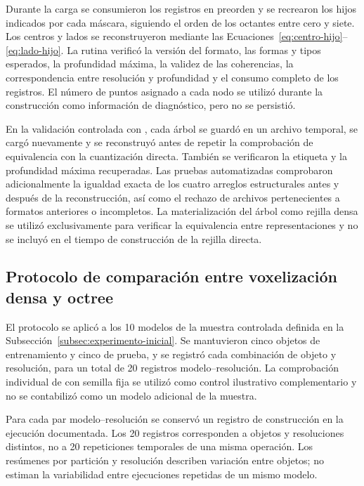 Durante la carga se consumieron los registros en preorden y se recrearon los hijos indicados por cada máscara, siguiendo el orden de los octantes entre cero y siete. Los centros y lados se reconstruyeron mediante las Ecuaciones~\eqref{eq:centro-hijo}--\eqref{eq:lado-hijo}. La rutina verificó la versión del formato, las formas y tipos esperados, la profundidad máxima, la validez de las coherencias, la correspondencia entre resolución y profundidad y el consumo completo de los registros. El número de puntos asignado a cada nodo se utilizó durante la construcción como información de diagnóstico, pero no se persistió.

En la validación controlada con \protect{}, cada árbol se guardó en un archivo temporal, se cargó nuevamente y se reconstruyó antes de repetir la comprobación de equivalencia con la cuantización directa. También se verificaron la etiqueta y la profundidad máxima recuperadas. Las pruebas automatizadas comprobaron adicionalmente la igualdad exacta de los cuatro arreglos estructurales antes y después de la reconstrucción, así como el rechazo de archivos pertenecientes a formatos anteriores o incompletos. La materialización del árbol como rejilla densa se utilizó exclusivamente para verificar la equivalencia entre representaciones y no se incluyó en el tiempo de construcción de la rejilla directa.

\subsection{Protocolo de comparación entre voxelización densa y octree}
\label{subsec:comparacion-densa-octree}

El protocolo se aplicó a los 10 modelos de la muestra controlada definida en la Subsección~\ref{subsec:experimento-inicial}. Se mantuvieron cinco objetos de entrenamiento y cinco de prueba, y se registró cada combinación de objeto y resolución, para un total de 20 registros modelo--resolución. La comprobación individual de \protect{} con semilla fija se utilizó como control ilustrativo complementario y no se contabilizó como un modelo adicional de la muestra.

Para cada par modelo--resolución se conservó un registro de construcción en la ejecución documentada. Los 20 registros corresponden a objetos y resoluciones distintos, no a 20 repeticiones temporales de una misma operación. Los resúmenes por partición y resolución describen variación entre objetos; no estiman la variabilidad entre ejecuciones repetidas de un mismo modelo.

